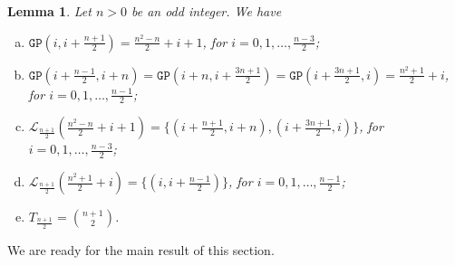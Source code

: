 \documentclass[journal,draftcls,onecolumn,12pt,twoside]{IEEEtran}
\newtheorem{lemma}[theorem]{\bf Lemma}
\newcommand{\GP}{{\mathtt{GP}}}
\begin{document}
\begin{lemma}\label{lemma:GP_odd}
Let $n>0$ be an odd integer.
We have
\begin{enumerate}[(a)]
\item $\GP(i,i+\frac{n+1}{2})=\frac{n^2-n}{2}+i+1$, for $i=0,1,\ldots, \frac{n-3}{2}$;
\smallskip
\item $\GP(i+\frac{n-1}{2},i+n) = \GP(i+n,i+\frac{3n+1}{2}) = \GP(i+\frac{3n+1}{2},i)=\frac{n^2+1}{2}+i$, for $i=0,1,\ldots, \frac{n-1}{2}$;
\smallskip
\item $\mathcal{L}_{\frac{n+1}{2}}(\frac{n^2-n}{2}+i+1) = \{(i+\frac{n+1}{2},i+n),(i+\frac{3n+1}{2},i)\}$, for $i=0,1,\ldots, \frac{n-3}{2}$; 
\smallskip
\item $\mathcal{L}_{\frac{n+1}{2}}(\frac{n^2+1}{2}+i) = \{(i,i+\frac{n-1}{2})\}$, for $i=0,1,\ldots, \frac{n-1}{2}$;
\smallskip
\item $T_{\frac{n+1}{2}}={n+1\choose 2}$.
\end{enumerate}
\end{lemma}

\medskip

We are ready for the main result of this section. 
\end{document}
